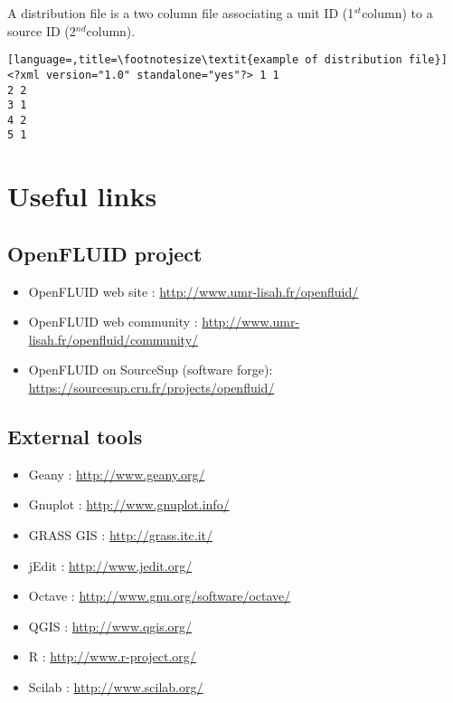 A distribution file is a two column file associating a unit ID
(1$^{st}$column) to a source ID (2$^{nd}$column).
\begin{lstlisting}[language=,title=\footnotesize\textit{example of distribution file}] <?xml version="1.0" standalone="yes"?> 1 1
2 2
3 1
4 2
5 1
\end{lstlisting}

\medskip

\section{Useful links}

\subsection{OpenFLUID project}

\begin{itemize}
  \item OpenFLUID web site : \textcolor{blue}{\url{http://www.umr-lisah.fr/openfluid/}}  
  \item OpenFLUID web community : \textcolor{blue}{\url{http://www.umr-lisah.fr/openfluid/community/}}
  \item OpenFLUID on SourceSup (software forge): \textcolor{blue}{\url{https://sourcesup.cru.fr/projects/openfluid/}} 
\end{itemize}


\subsection{External tools}

\begin{itemize}
  \item Geany : \textcolor{blue}{\url{http://www.geany.org/}}
  \item Gnuplot : \textcolor{blue}{\url{http://www.gnuplot.info/}}
  \item GRASS GIS : \textcolor{blue}{\url{http://grass.itc.it/}}
  \item jEdit : \textcolor{blue}{\url{http://www.jedit.org/}}
  \item Octave : \textcolor{blue}{\url{http://www.gnu.org/software/octave/}}
  \item QGIS : \textcolor{blue}{\url{http://www.qgis.org/}}
  \item R : \textcolor{blue}{\url{http://www.r-project.org/}}
  \item Scilab : \textcolor{blue}{\url{http://www.scilab.org/}} 
\end{itemize}   

